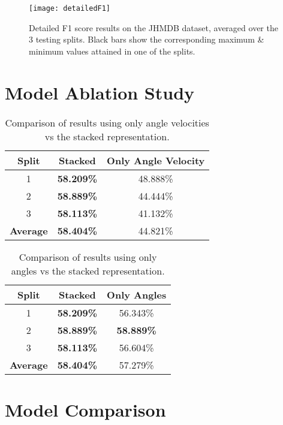 \begin{figure}[h]
	\texttt{[image: detailedF1]}
	\centering
	\caption{Detailed F1 score results on the JHMDB dataset, averaged over the 3 testing splits. Black bars show the corresponding maximum \& minimum values attained in one of the splits.}
	\label{fig:detailed-f1}
\end{figure}

\section{Model Ablation Study}

\begin{table}[h]
	\centering
	\begin{tabular}{||c c c||} 
		\hline
		\textbf{Split} & \textbf{Stacked} & \textbf{Only Angle Velocity} \\ [0.5ex] 
		\hline\hline
		1 & \textbf{58.209\%} & 48.888\% \\ 
		\hline
		2 & \textbf{58.889\%} & 44.444\% \\
		\hline
		3 & \textbf{58.113\%} & 41.132\% \\
		\hline
		\hline
		\textbf{Average} & \textbf{58.404\%} & 44.821\% \\
		\hline
	\end{tabular}
	\label{tab:acc-results-v-velocity}
	\caption{Comparison of results using only angle velocities vs the stacked representation.}
\end{table}

\begin{table}[h]
	\centering
	\begin{tabular}{||c c c||} 
		\hline
		\textbf{Split} & \textbf{Stacked} & \textbf{Only Angles} \\ [0.5ex] 
		\hline\hline
		1 & \textbf{58.209\%} & 56.343\% \\ 
		\hline
		2 & \textbf{58.889\%} & \textbf{58.889\%} \\
		\hline
		3 & \textbf{58.113\%} & 56.604\% \\
		\hline
		\hline
		\textbf{Average} & \textbf{58.404\%} & 57.279\% \\
		\hline
	\end{tabular}
	\label{tab:acc-results-v-angle}
	\caption{Comparison of results using only angles vs the stacked representation.}
\end{table}

\section{Model Comparison}